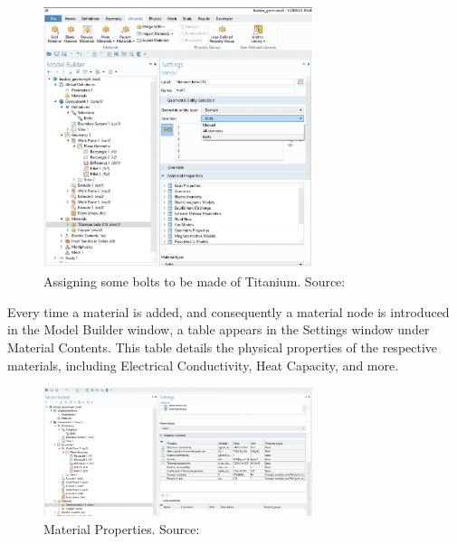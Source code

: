 \begin{figure}[H]
  \centering
  \includegraphics[width=0.7\textwidth]{Chapters/Figures/Chapter 3 Figures/Bolts Selection Choice.png}
  \caption{Assigning some bolts to be made of Titanium. Source: \cite{multiphysics__modeling_nodate}}
  \label{fig:Assigning some bolts to be made of Titanium.}
\end{figure}

Every time a material is added, and consequently a material node is introduced in the Model Builder window, a table appears in the Settings window under Material Contents. This table details the physical properties of the respective materials, including Electrical Conductivity, Heat Capacity, and more.

\begin{figure}[H]
  \centering
  \includegraphics[width=0.7\textwidth]{Chapters/Figures/Chapter 3 Figures/Material Contents in Settings Window.png}
  \caption{Material Properties. Source: \cite{multiphysics__modeling_nodate}}
  \label{fig: Material properties.}
\end{figure}

